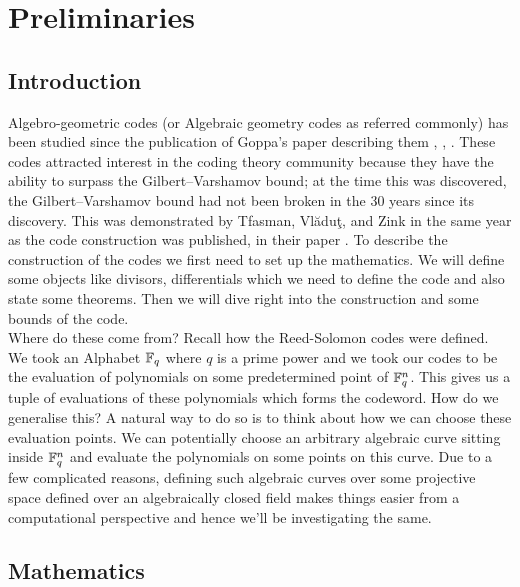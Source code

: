\chapter{Preliminaries}
\section{Introduction}
Algebro-geometric codes (or Algebraic geometry codes as referred commonly) has been studied since the publication of Goppa's paper describing them \cite{goppafirst}, \cite{Goppa1981CodesOA}, \cite{Goppa1984CodesAI}. These codes attracted interest in the coding theory community because they have the ability to surpass the Gilbert–Varshamov bound; at the time this was discovered, the Gilbert–Varshamov bound had not been broken in the 30 years since its discovery. This was demonstrated by Tfasman, Vl\u{a}du\c{t}, and Zink in the same year as the code construction was published, in their paper  \cite{tvzbound}. To describe the construction of the codes we first need to set up the mathematics. We will define some objects like divisors, differentials which we need to define the code and also state some theorems. Then we will dive right into the construction and some bounds of the code.\\

Where do these come from? Recall how the Reed-Solomon codes were defined. We took an Alphabet $\mathbb{F}_q$ where $q$ is a prime power and we took our codes to be the evaluation of polynomials on some predetermined point of $\mathbb{F}_q^n$. This gives us a tuple of evaluations of these polynomials which forms the codeword. How do we generalise this? A natural way to do so is to think about how we can choose these evaluation points. We can potentially choose an arbitrary algebraic curve sitting inside $\mathbb{F}_q^n$ and evaluate the polynomials on some points on this curve. Due to a few complicated reasons, defining such algebraic curves over some projective space defined over an algebraically closed field makes things easier from a computational perspective and hence we'll be investigating the same.
\section{Mathematics}
